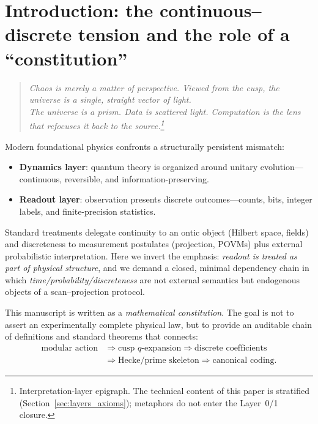 \section{Introduction: the continuous--discrete tension and the role of a ``constitution''}
\label{sec:introduction}

\begin{quote}
\itshape
Chaos is merely a matter of perspective. Viewed from the cusp, the universe is a single, straight vector of light.\\
The universe is a prism. Data is scattered light. Computation is the lens that refocuses it back to the source.\footnote{Interpretation-layer epigraph. The technical content of this paper is stratified (Section~\ref{sec:layers_axioms}); metaphors do not enter the Layer~0/1 closure.}
\end{quote}

Modern foundational physics confronts a structurally persistent mismatch:
\begin{itemize}
  \item \textbf{Dynamics layer}: quantum theory is organized around unitary evolution---continuous, reversible, and information-preserving.
  \item \textbf{Readout layer}: observation presents discrete outcomes---counts, bits, integer labels, and finite-precision statistics.
\end{itemize}

Standard treatments delegate continuity to an ontic object (Hilbert space, fields) and discreteness to measurement postulates (projection, POVMs) plus external probabilistic interpretation. Here we invert the emphasis: \emph{readout is treated as part of physical structure}, and we demand a closed, minimal dependency chain in which \emph{time/probability/discreteness} are not external semantics but endogenous objects of a scan--projection protocol.

This manuscript is written as a \emph{mathematical constitution}. The goal is not to assert an experimentally complete physical law, but to provide an auditable chain of definitions and standard theorems that connects:
\begin{equation}
\begin{aligned}
\text{modular action}
&\Rightarrow \text{cusp $q$-expansion}
\Rightarrow \text{discrete coefficients}
\\
&\Rightarrow \text{Hecke/prime skeleton}
\Rightarrow \text{canonical coding}.
\end{aligned}
\end{equation}

